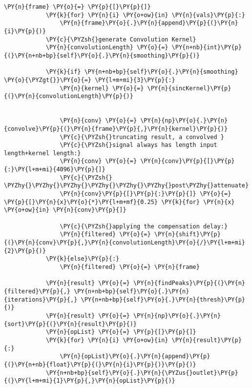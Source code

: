 \begin{Verbatim}[commandchars=\\\{\}]
       		\PY{n}{frame} \PY{o}{=} \PY{p}{[}\PY{p}{]}
       		\PY{k}{for} \PY{n}{i} \PY{o+ow}{in} \PY{n}{vals}\PY{p}{:}
       			\PY{n}{frame}\PY{o}{.}\PY{n}{append}\PY{p}{(}\PY{n}{i}\PY{p}{)}
       		\PY{c}{\PYZsh{}generate Convolution Kernel}
       		\PY{n}{convolutionLength} \PY{o}{=} \PY{n+nb}{int}\PY{p}{(}\PY{n+nb+bp}{self}\PY{o}{.}\PY{n}{smoothing}\PY{p}{)}
       		
       		\PY{k}{if} \PY{n+nb+bp}{self}\PY{o}{.}\PY{n}{smoothing} \PY{o}{\PYZgt{}}\PY{o}{=} \PY{l+m+mi}{3}\PY{p}{:}
       			\PY{n}{kernel} \PY{o}{=} \PY{n}{sincKernel}\PY{p}{(}\PY{n}{convolutionLength}\PY{p}{)}
       		
       
       			\PY{n}{conv} \PY{o}{=} \PY{n}{np}\PY{o}{.}\PY{n}{convolve}\PY{p}{(}\PY{n}{frame}\PY{p}{,}\PY{n}{kernel}\PY{p}{)}
       			\PY{c}{\PYZsh{}truncating result, a convolved }
       			\PY{c}{\PYZsh{}signal always has length input length+kernel length:}
       			\PY{n}{conv} \PY{o}{=} \PY{n}{conv}\PY{p}{[}\PY{p}{:}\PY{l+m+mi}{4096}\PY{p}{]}
       			\PY{c}{\PYZsh{} \PYZhy{}\PYZhy{}\PYZhy{}\PYZhy{}\PYZhy{}\PYZhy{}post\PYZhy{}attenuate}
       			\PY{n}{conv}\PY{p}{[}\PY{p}{:}\PY{p}{]} \PY{o}{=} \PY{p}{[}\PY{n}{x}\PY{o}{*}\PY{l+m+mf}{0.25} \PY{k}{for} \PY{n}{x} \PY{o+ow}{in} \PY{n}{conv}\PY{p}{]}
       	
       			\PY{c}{\PYZsh{}applying the compensation delay:}
       			\PY{n}{filtered} \PY{o}{=} \PY{n}{shift}\PY{p}{(}\PY{n}{conv}\PY{p}{,}\PY{n}{convolutionLength}\PY{o}{/}\PY{l+m+mi}{2}\PY{p}{)}
       		\PY{k}{else}\PY{p}{:} 
       			\PY{n}{filtered} \PY{o}{=} \PY{n}{frame}
       
       		\PY{n}{result} \PY{o}{=} \PY{n}{findPeaks}\PY{p}{(}\PY{n}{filtered}\PY{p}{,} \PY{n+nb+bp}{self}\PY{o}{.}\PY{n}{iterations}\PY{p}{,} \PY{n+nb+bp}{self}\PY{o}{.}\PY{n}{thresh}\PY{p}{)}
       		\PY{n}{result} \PY{o}{=} \PY{n}{np}\PY{o}{.}\PY{n}{sort}\PY{p}{(}\PY{n}{result}\PY{p}{)}
       		\PY{n}{opList} \PY{o}{=} \PY{p}{[}\PY{p}{]}
       		\PY{k}{for} \PY{n}{i} \PY{o+ow}{in} \PY{n}{result}\PY{p}{:}
       			\PY{n}{opList}\PY{o}{.}\PY{n}{append}\PY{p}{(}\PY{n+nb}{float}\PY{p}{(}\PY{n}{i}\PY{p}{)}\PY{p}{)}
       		\PY{n+nb+bp}{self}\PY{o}{.}\PY{n}{\PYZus{}outlet}\PY{p}{(}\PY{l+m+mi}{1}\PY{p}{,}\PY{n}{opList}\PY{p}{)}
\end{Verbatim}


    
   
    
